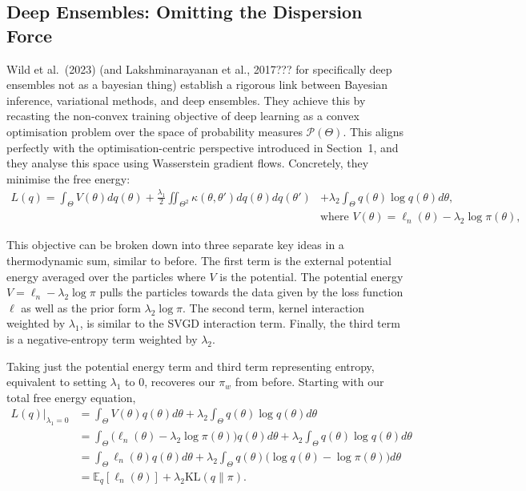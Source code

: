 \documentclass[11pt,a4paper]{article}
\newcommand{\add}[1]{{\color{red}#1}}
\begin{document}
\subsection{Deep Ensembles: Omitting the Dispersion Force}

Wild et al.~(2023) \add{(and Lakshminarayanan et al., 2017??? for specifically deep ensembles not as a bayesian thing)} establish a rigorous link between Bayesian inference, variational methods, and deep ensembles. They achieve this by recasting the non-convex training objective of deep learning as a convex optimisation problem over the space of probability measures $\mathcal{P}(\Theta)$. This aligns perfectly with the optimisation-centric perspective introduced in Section~1, and they analyse this space using Wasserstein gradient flows. Concretely, they minimise the free energy:
\begin{equation}
    \begin{split}
        L(q) = \int_\Theta V(\theta)dq(\theta)
        + \frac{\lambda_1}{2}\iint_{\Theta^2} \kappa(\theta,\theta')dq(\theta)dq(\theta')
         & + \lambda_2\int_\Theta q(\theta)\log q(\theta)d\theta,               \\
         & \text{where } V(\theta) = \ell_n(\theta) - \lambda_2\log\pi(\theta),
    \end{split}
    \label{eq:freeenergy}
\end{equation}

This objective can be broken down into three separate key ideas in a thermodynamic sum, similar to before. The first term is the external potential energy averaged over the particles where $V$ is the potential. The potential energy $V = \ell_n - \lambda_2\log\pi$ pulls the particles towards the data given by the loss function $\ell$ as well as the prior form $\lambda_2\log\pi$. The second term, kernel interaction weighted by $\lambda_1$, is similar to the SVGD interaction term. Finally, the third term is a negative-entropy term weighted by $\lambda_2$.

Taking just the potential energy term and third term representing entropy, equivalent to setting $\lambda_1$ to 0, recoveres our $\pi_w$ from before. Starting with our total free energy equation,
\begin{align*}
    L(q)\big|_{\lambda_1=0} & = \int_\Theta V(\theta)q(\theta)d\theta + \lambda_2\int_\Theta q(\theta)\log q(\theta)d\theta                                              \\
                            & = \int_\Theta \big( \ell_n(\theta) - \lambda_2\log\pi(\theta) \big) q(\theta)d\theta + \lambda_2\int_\Theta q(\theta)\log q(\theta)d\theta \\
                            & = \int_\Theta \ell_n(\theta)q(\theta)d\theta + \lambda_2\int_\Theta q(\theta) \big( \log q(\theta) - \log\pi(\theta) \big)d\theta          \\
                            & = \mathbb{E}_q[\ell_n(\theta)] + \lambda_2\mathrm{KL}(q\|\pi).
\end{align*}
\end{document}
